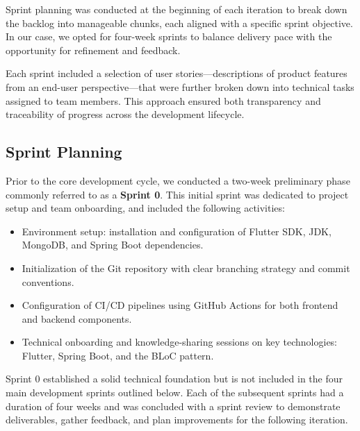 Sprint planning was conducted at the beginning of each iteration to break down the backlog into manageable chunks, each aligned with a specific sprint objective. In our case, we opted for four-week sprints to balance delivery pace with the opportunity for refinement and feedback.

Each sprint included a selection of user stories—descriptions of product features from an end-user perspective—that were further broken down into technical tasks assigned to team members. This approach ensured both transparency and traceability of progress across the development lifecycle.

\subsection{Sprint Planning}

Prior to the core development cycle, we conducted a two-week preliminary phase commonly referred to as a \textbf{Sprint 0}. This initial sprint was dedicated to project setup and team onboarding, and included the following activities:

\begin{itemize}
    \item Environment setup: installation and configuration of Flutter SDK, JDK, MongoDB, and Spring Boot dependencies.
    \item Initialization of the Git repository with clear branching strategy and commit conventions.
    \item Configuration of CI/CD pipelines using GitHub Actions for both frontend and backend components.
    \item Technical onboarding and knowledge-sharing sessions on key technologies: Flutter, Spring Boot, and the BLoC pattern.
\end{itemize}

Sprint 0 established a solid technical foundation but is not included in the four main development sprints outlined below. Each of the subsequent sprints had a duration of four weeks and was concluded with a sprint review to demonstrate deliverables, gather feedback, and plan improvements for the following iteration.

